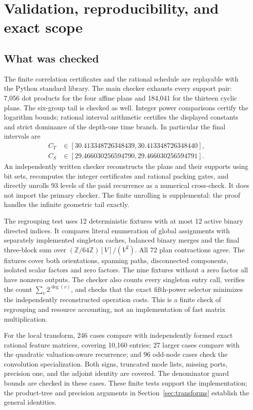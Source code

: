 \section{Validation, reproducibility, and exact scope}
\label{sec:validation}

\subsection{What was checked}
The finite correlation certificates and the rational schedule are replayable
with the Python standard library. The main checker exhausts every support
pair: 7,056 dot products for the four affine plans and 184,041 for the
thirteen cyclic plans. The six-group tail is checked as well. Integer power
comparisons certify the logarithm bounds; rational interval arithmetic
certifies the displayed constants and strict dominance of the depth-one
time branch. In particular the final intervals are
\[
 \begin{aligned}
 C_T&\in[30.413348726348439,30.413348726348440],\\
 C_S&\in[29.466030256594790,29.466030256594791].
 \end{aligned}
\]
An independently written checker reconstructs the plans and their supports
using bit sets, recomputes the integer certificates and rational packing
gates, and directly unrolls 93 levels of the paid recurrence as a numerical
cross-check. It does not import the primary checker. The finite unrolling
is supplemental: the proof handles the infinite geometric tail exactly.

The regrouping test uses 12 deterministic fixtures with at most 12 active
binary directed indices. It compares literal enumeration of global
assignments with separately implemented singleton caches, balanced binary
merges and the final three-block sum over
$(\mathbb Z/64\mathbb Z)[V]/(V^2)$. All 72 plan contractions agree.
The fixtures cover both orientations, spanning paths, disconnected
components, isolated scalar factors and zero factors. The nine fixtures
without a zero factor all have nonzero outputs. The checker also counts
every singleton entry call, verifies the count $\sum_v2^{\deg(v)}$,
and checks that the exact fifth-power selector minimizes the independently
reconstructed operation costs. This is a finite check of regrouping and
resource accounting, not an implementation of fast matrix multiplication.

For the local transform, 246 cases compare with independently formed
exact rational feature matrices, covering 10,160 entries; 27 larger cases
compare with the quadratic valuation-aware recurrence; and 96 odd-node
cases check the convolution specialization. Both signs, truncated mode
lists, missing ports, precision one, and the adjoint identity are covered.
The denominator guard bounds are checked in these cases. These finite
tests support the implementation; the product-tree and precision arguments
in Section~\ref{sec:transforms} establish the general identities.

